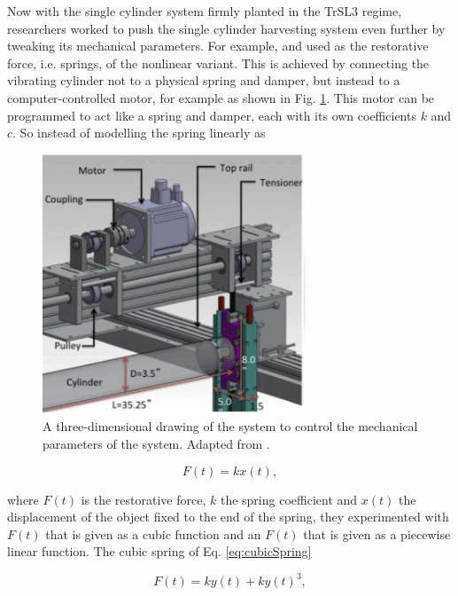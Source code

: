 \documentclass[oneside]{utmthesis}
\begin{document}
Now with the single cylinder system firmly planted in the TrSL3 regime, researchers worked to push the single cylinder harvesting system even further by tweaking its mechanical parameters. For example, \citet{Sun2018} and \citet{Ma2018} used as the restorative force, i.e. springs, of the nonlinear variant. This is achieved by connecting the vibrating cylinder not to a physical spring and damper, but instead to a computer-controlled motor, for example as shown in Fig. \ref{fig:vckSystemModel}. This motor can be programmed to act like a spring and damper, each with its own coefficients $k$ and $c$. So instead of modelling the spring linearly as

\begin{figure}[!h]
  \centering
  \hspace{1cm} \includegraphics[width=0.7\textwidth]{figs/vckSystemModel}
  \caption{A three-dimensional drawing of the system to control the mechanical parameters of the system. Adapted from \citet{Ma2018}.}
  \label{fig:vckSystemModel}
\end{figure}


\begin{equation}
  F(t) = k x(t),
  \label{eq:linearSpring}
\end{equation}

\noindent where $F(t)$ is the restorative force, $k$ the spring coefficient and $x(t)$ the displacement of the object fixed to the end of the spring, they experimented with $F(t)$ that is given as a cubic function and an $F(t)$ that is given as a piecewise linear function. The cubic spring of Eq. \ref{eq:cubicSpring}

\begin{equation}
  F(t) = k y(t) + k y(t)^{3},
  \label{eq:cubicSpring}
\end{equation}
\end{document}
